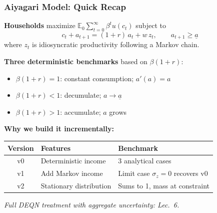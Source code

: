 \documentclass[10pt,english,aspectratio=169]{beamer}
\begin{document}
\begin{frame}
\frametitle{Aiyagari Model: Quick Recap}

\textbf{Households} maximize $\mathbb{E}_0 \sum_{t=0}^\infty \beta^t u(c_t)$ subject to
\[
c_t + a_{t+1} = (1+r)\, a_t + w\, z_t, \qquad a_{t+1} \geq \underline{a}
\]
where $z_t$ is idiosyncratic productivity following a Markov chain.

\vspace{0.15cm}

\textbf{Three deterministic benchmarks} based on $\beta(1+r)$:
\begin{itemize}
    \item $\beta(1+r) = 1$: constant consumption; $a'(a) = a$
    \item $\beta(1+r) < 1$: decumulate; $a \to \underline{a}$
    \item $\beta(1+r) > 1$: accumulate; $a$ grows
\end{itemize}

\vspace{0.15cm}

\textbf{Why we build it incrementally:}
\begin{center}
\footnotesize
\begin{tabular}{|c|l|l|}
\hline
\textbf{Version} & \textbf{Features} & \textbf{Benchmark} \\ \hline
v0 & Deterministic income & 3 analytical cases \\ \hline
v1 & Add Markov income & Limit case $\sigma_z=0$ recovers v0 \\ \hline
v2 & Stationary distribution & Sums to 1, mass at constraint \\ \hline
\end{tabular}
\end{center}

\textit{Full DEQN treatment with aggregate uncertainty: Lec.~6.}
\end{frame}
\end{document}
